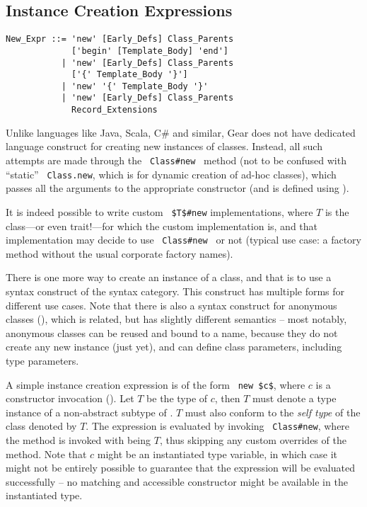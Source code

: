 \subsection{Instance Creation Expressions}
\label{sec:instance-creation-exprs}

\syntax\begin{lstlisting}
New_Expr ::= 'new' [Early_Defs] Class_Parents 
             ['begin' [Template_Body] 'end']
           | 'new' [Early_Defs] Class_Parents 
             ['{' Template_Body '}']
           | 'new' '{' Template_Body '}'
           | 'new' [Early_Defs] Class_Parents 
             Record_Extensions
\end{lstlisting}

Unlike languages like Java, Scala, C\# and similar, Gear does not have dedicated language construct for creating new instances of classes. Instead, all such attempts are made through the ~\lstinline[deletekeywords={new}]!Class#new!~ method (not to be confused with ``static'' ~\lstinline[deletekeywords={new}]@Class.new@, which is for dynamic creation of ad-hoc classes), which passes all the arguments to the appropriate constructor (and is defined using ). 

It is indeed possible to write custom ~\lstinline[deletekeywords={new}]!$T$#new! implementations, where $T$ is the class---or even trait!---for which the custom implementation is, and that implementation may decide to use ~\lstinline[deletekeywords={new}]!Class#new!~ or not (typical use case: a factory method without the usual corporate factory names).

There is one more way to create an instance of a class, and that is to use a syntax construct of the  syntax category. This construct has multiple forms for different use cases. Note that there is also a syntax construct for anonymous classes (), which is related, but has slightly different semantics -- most notably, anonymous classes can be reused and bound to a name, because they do not create any new instance (just yet), and can define class parameters, including type parameters. 

A simple instance creation expression is of the form ~\lstinline!new $c$!, where $c$ is a constructor invocation (). Let $T$ be the type of $c$, then $T$ must denote a type instance of a non-abstract subtype of . $T$ must also conform to the {\em self type} of the class denoted by $T$. The expression is evaluated by invoking ~\lstinline[deletekeywords={new}]!Class#new!, where the method is invoked with  being $T$, thus skipping any custom overrides of the method. Note that $c$ might be an instantiated type variable, in which case it might not be entirely possible to guarantee that the expression will be evaluated successfully -- no matching and accessible constructor might be available in the instantiated type. 

